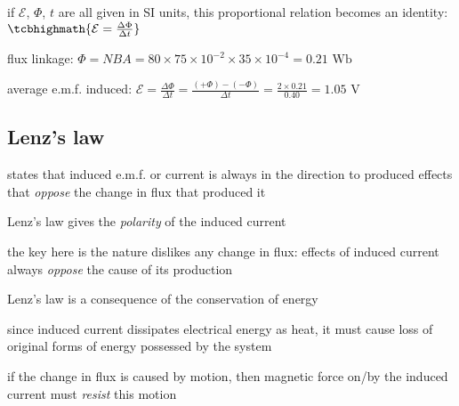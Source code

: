 \cmt if $\mathcal{E}$, $\Phi$, $t$ are all given in SI units, this proportional relation becomes an identity: $\tcbhighmath{\mathcal{E} = \frac{\Delta \Phi}{\Delta t}}$


\begin{soln} flux linkage: $\Phi = NBA = 80 \times 75\times10^{-2} \times 35 \times 10^{-4} = 0.21 \text{ Wb}$

average e.m.f. induced: $\mathcal{E} = \frac{\Delta \Phi}{\Delta t} = \frac{(+\Phi)-(-\Phi)}{\Delta t} = \frac{2\times 0.21}{0.40} = 1.05 \text{ V}$ \end{soln}

\subsection{Lenz's law}

\rcyskip

\begin{ilight}
	 states that induced e.m.f. or current is always in the direction to produced effects that \emph{oppose} the change in flux that produced it 
\end{ilight}

\cmt Lenz's law gives the \emph{polarity} of the induced current

the key here is the nature dislikes any change in flux: effects of induced current always \emph{oppose} the cause of its production

\cmt Lenz's law is a consequence of the conservation of energy

since induced current dissipates electrical energy as heat, it must cause loss of original forms of energy possessed by the system

if the change in flux is caused by motion, then magnetic force on/by the induced current must \emph{resist} this motion



